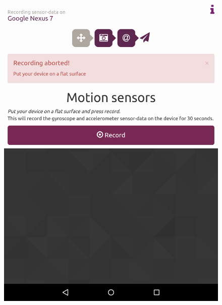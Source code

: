 \begin{figure}[H]
  \hspace{-2cm}
  \centering
  \begin{minipage}[c]{.23\textwidth}
    \centering
    \includegraphics[scale=0.15]{img/sensorrec-nexus-2-notRec}
  \end{minipage}
  \hspace{2cm}
  \begin{minipage}[c]{.23\textwidth}
    \centering

\end{minipage}
\end{figure}
